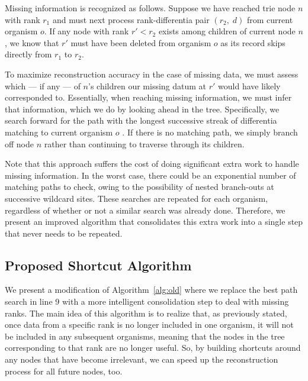 

Missing information is recognized as follows.
Suppose we have reached trie node $n$ with rank $r_1$ and must next process rank-differentia pair $(r_2,\; d)$ from current organism $o$.
If any node with rank $r' < r_2$ exists among children of current node $n$, we know that $r'$ must have been deleted from organism $o$ as its record skips directly from $r_1$ to $r_2$.

To maximize reconstruction accuracy in the case of missing data, we must assess which --- if any --- of $n$'s children our missing datum at $r'$ would have likely corresponded to.
Essentially, when reaching missing information, we must infer that information, which we do by looking ahead in the tree.
Specifically, we search forward for the path with the longest successive streak of differentia matching to current organism $o$ \citep{moreno2024analysis}.
If there is no matching path, we simply branch off node $n$ rather than continuing to traverse through its children.

Note that this approach suffers the cost of doing significant extra work to handle missing information.
In the worst case, there could be an exponential number of matching paths to check, owing to the possibility of nested branch-outs at successive wildcard sites.
These searches are repeated for each organism, regardless of whether or not a similar search was already done.
Therefore, we present an improved algorithm that consolidates this extra work into a single step that never needs to be repeated.

\subsection{Proposed Shortcut Algorithm} \label{sec:algorithm:shortcut}



We present a modification of Algorithm~\ref{alg:old} where we replace the best path search in line 9 with a more intelligent consolidation step to deal with missing ranks.
The main idea of this algorithm is to realize that, as previously stated, once data from a specific rank is no longer included in one organism, it will not be included in any subsequent organisms, meaning that the nodes in the tree corresponding to that rank are no longer useful.
So, by building shortcuts around any nodes that have become irrelevant, we can speed up the reconstruction process for all future nodes, too.

